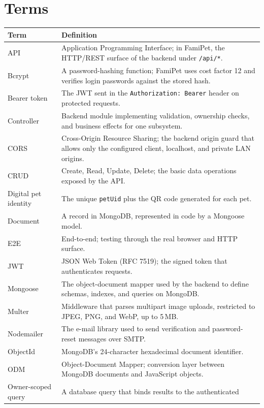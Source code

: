 \section*{Terms}

\begin{center}
\begin{longtable}{@{}p{3.4cm}p{11.2cm}@{}}
\toprule
\textbf{Term} & \textbf{Definition} \\
\midrule
API & Application Programming Interface; in FamiPet, the HTTP/REST surface of
the backend under \texttt{/api/*}. \\
Bcrypt & A password-hashing function; FamiPet uses cost factor 12 and verifies
login passwords against the stored hash. \\
Bearer token & The JWT sent in the \texttt{Authorization: Bearer} header on
protected requests. \\
Controller & Backend module implementing validation, ownership checks, and
business effects for one subsystem. \\
CORS & Cross-Origin Resource Sharing; the backend origin guard that allows only
the configured client, localhost, and private LAN origins. \\
CRUD & Create, Read, Update, Delete; the basic data operations exposed by the
API. \\
Digital pet identity & The unique \texttt{petUid} plus the QR code generated for
each pet. \\
Document & A record in MongoDB, represented in code by a Mongoose model. \\
E2E & End-to-end; testing through the real browser and HTTP surface. \\
JWT & JSON Web Token (RFC 7519); the signed token that authenticates requests. \\
Mongoose & The object-document mapper used by the backend to define schemas,
indexes, and queries on MongoDB. \\
Multer & Middleware that parses multipart image uploads, restricted to JPEG, PNG,
and WebP, up to 5\,MB. \\
Nodemailer & The e-mail library used to send verification and password-reset
messages over SMTP. \\
ObjectId & MongoDB's 24-character hexadecimal document identifier. \\
ODM & Object-Document Mapper; conversion layer between MongoDB documents and
JavaScript objects. \\
Owner-scoped query & A database query that binds results to the authenticated

\end{longtable}
\end{center}
